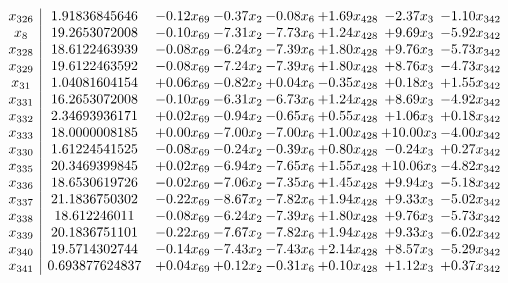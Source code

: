 \documentclass[8pt]{article}
\begin{document}
\[\begin{array}{c| c c@{\hskip 2pt} c@{\hskip 2pt} c@{\hskip 2pt} c@{\hskip 2pt} c@{\hskip 2pt} c@{\hskip 2pt} }
 x_{326}   &  1.91836845646 & -0.12 x_{69} & -0.37 x_{2} & -0.08 x_{6} & +  1.69 x_{428} & -2.37 x_{3} & -1.10 x_{342}\\
 x_{8}   &  19.2653072008 & -0.10 x_{69} & -7.31 x_{2} & -7.73 x_{6} & +  1.24 x_{428} & +  9.69 x_{3} & -5.92 x_{342}\\
 x_{328}   &  18.6122463939 & -0.08 x_{69} & -6.24 x_{2} & -7.39 x_{6} & +  1.80 x_{428} & +  9.76 x_{3} & -5.73 x_{342}\\
 x_{329}   &  19.6122463592 & -0.08 x_{69} & -7.24 x_{2} & -7.39 x_{6} & +  1.80 x_{428} & +  8.76 x_{3} & -4.73 x_{342}\\
 x_{31}   &  1.04081604154 & +  0.06 x_{69} & -0.82 x_{2} & +  0.04 x_{6} & -0.35 x_{428} & +  0.18 x_{3} & +  1.55 x_{342}\\
 x_{331}   &  16.2653072008 & -0.10 x_{69} & -6.31 x_{2} & -6.73 x_{6} & +  1.24 x_{428} & +  8.69 x_{3} & -4.92 x_{342}\\
 x_{332}   &  2.34693936171 & +  0.02 x_{69} & -0.94 x_{2} & -0.65 x_{6} & +  0.55 x_{428} & +  1.06 x_{3} & +  0.18 x_{342}\\
 x_{333}   &  18.0000008185 & +  0.00 x_{69} & -7.00 x_{2} & -7.00 x_{6} & +  1.00 x_{428} & + 10.00 x_{3} & -4.00 x_{342}\\
 x_{330}   &  1.61224541525 & -0.08 x_{69} & -0.24 x_{2} & -0.39 x_{6} & +  0.80 x_{428} & -0.24 x_{3} & +  0.27 x_{342}\\
 x_{335}   &  20.3469399845 & +  0.02 x_{69} & -6.94 x_{2} & -7.65 x_{6} & +  1.55 x_{428} & + 10.06 x_{3} & -4.82 x_{342}\\
 x_{336}   &  18.6530619726 & -0.02 x_{69} & -7.06 x_{2} & -7.35 x_{6} & +  1.45 x_{428} & +  9.94 x_{3} & -5.18 x_{342}\\
 x_{337}   &  21.1836750302 & -0.22 x_{69} & -8.67 x_{2} & -7.82 x_{6} & +  1.94 x_{428} & +  9.33 x_{3} & -5.02 x_{342}\\
 x_{338}   &  18.612246011 & -0.08 x_{69} & -6.24 x_{2} & -7.39 x_{6} & +  1.80 x_{428} & +  9.76 x_{3} & -5.73 x_{342}\\
 x_{339}   &  20.1836751101 & -0.22 x_{69} & -7.67 x_{2} & -7.82 x_{6} & +  1.94 x_{428} & +  9.33 x_{3} & -6.02 x_{342}\\
 x_{340}   &  19.5714302744 & -0.14 x_{69} & -7.43 x_{2} & -7.43 x_{6} & +  2.14 x_{428} & +  8.57 x_{3} & -5.29 x_{342}\\
 x_{341}   &  0.693877624837 & +  0.04 x_{69} & +  0.12 x_{2} & -0.31 x_{6} & +  0.10 x_{428} & +  1.12 x_{3} & +  0.37 x_{342}\\

\end{array}\]
\end{document}
